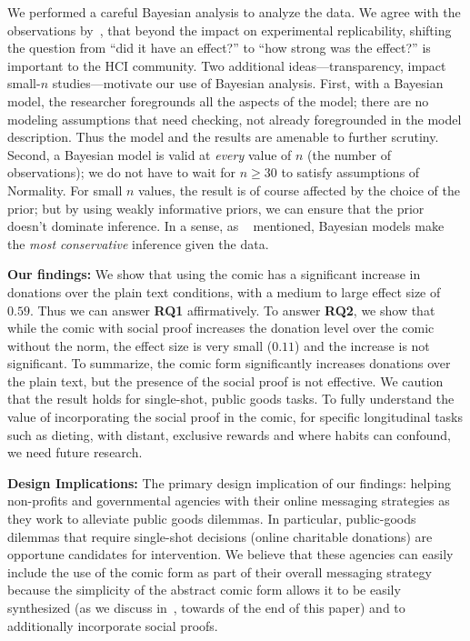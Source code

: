 We performed a careful Bayesian analysis to analyze the data. We agree with the observations by~\textcite{Kay2016}, that beyond the impact on experimental replicability, shifting the question from ``did it have an effect?'' to ``how strong was the effect?'' is important to the HCI community. Two additional ideas---transparency, impact small-$n$ studies---motivate our use of Bayesian analysis. First, with a Bayesian model, the researcher foregrounds all the aspects of the model; there are no modeling assumptions that need checking, not already foregrounded in the model description. Thus the model and the results are amenable to further scrutiny. Second, a Bayesian model is valid at \textit{every} value of $n$ (the number of observations); we do not have to wait for $n\geq 30$ to satisfy assumptions of Normality. For small $n$ values, the result is of course affected by the choice of the prior; but by using weakly informative priors, we can ensure that the prior doesn't dominate inference. In a sense, as ~\textcite[][Chapter 9]{McElreath2015} mentioned, Bayesian models make the \textit{most conservative} inference given the data.


\textbf{Our findings:} We show that using the comic has a significant increase in donations over the plain text conditions, with a medium to large effect size of $0.59$. Thus we can answer \textbf{RQ1} affirmatively. To answer \textbf{RQ2}, we show that while the comic with social proof increases the donation level over the comic without the norm, the effect size is very small ($0.11$) and the increase is not significant. To summarize, the comic form significantly increases donations over the plain text, but the presence of the social proof is not effective. We caution that the result holds for single-shot, public goods tasks. To fully understand the value of incorporating the social proof in the comic, for specific longitudinal tasks such as dieting, with distant, exclusive rewards and where habits can confound, we need future research.  

\textbf{Design Implications:} The primary design implication of our findings: helping non-profits and governmental agencies with their online messaging strategies as they work to alleviate public goods dilemmas. In particular, public-goods dilemmas that require single-shot decisions (online charitable donations) are opportune candidates for intervention. We believe that these agencies can easily include the use of the comic form as part of their overall messaging strategy because the simplicity of the abstract comic form allows it to be easily synthesized (as we discuss in~, towards of the end of this paper) and to additionally incorporate social proofs. 


